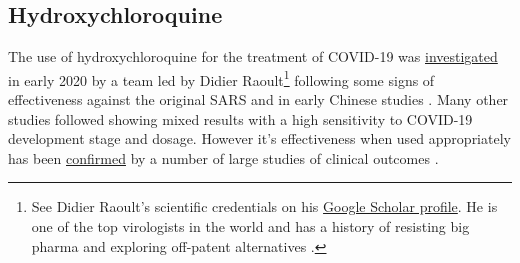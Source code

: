 \documentclass[11pt,a4paper,notitlepage]{report}
\begin{document}
\subsection*{Hydroxychloroquine}

The use of hydroxychloroquine for the treatment of COVID-19 was \href{https://pubmed.ncbi.nlm.nih.gov/32205204/}{investigated} in early 2020 by a team led by Didier Raoult\footnote{See Didier Raoult's scientific credentials on his \href{https://scholar.google.fr/citations?user=n8EF_6kAAAAJ&hl=fr}{Google Scholar profile}. He is one of the top virologists in the world and has a history of resisting big pharma and exploring off-patent alternatives \cite{doi:10.1177/1440783320936740}.} following some signs of effectiveness against the original SARS and in early Chinese studies \cite{Lagier2020-dw}. Many other studies followed showing mixed results with a high sensitivity to COVID-19 development stage and dosage. However it's effectiveness when used appropriately has been \href{https://www.ncbi.nlm.nih.gov/pmc/articles/PMC8023208/}{confirmed} by a number of large studies of clinical outcomes \cite{Mokhtari2021-ot}. 

\end{document}
